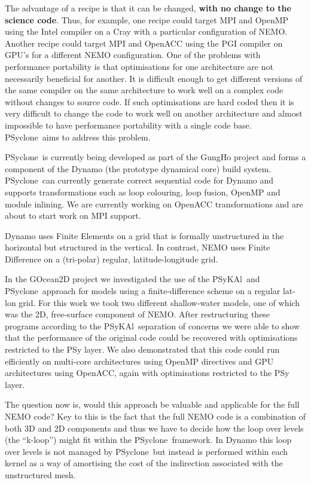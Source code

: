 \documentclass{article}
\newcommand{\psykal}{{PS}y{KA}l}
\newcommand{\psyclone}{{PS}yclone}
\begin{document}
The advantage of a recipe is that it can be changed, {\bf with no
  change to the science code}. Thus, for example, one recipe could
target MPI and OpenMP using the Intel compiler on a Cray with a
particular configuration of NEMO. Another recipe could target MPI and
OpenACC using the PGI compiler on GPU's for a different NEMO
configuration. One of the problems with performance portability is
that optimisations for one architecture are not necessarily beneficial
for another. It is difficult enough to get different versions of the
same compiler on the same architecture to work well on a complex code
without changes to source code. If such optimisations are hard coded
then it is very difficult to change the code to work well on another
architecture and almost impossible to have performance portability
with a single code base. \psyclone\ aims to address this problem.

\psyclone\ is currently being developed as part of the GungHo project
and forms a component of the Dynamo (the prototype dynamical core)
build system. \psyclone\ can currently generate correct sequential code
for Dynamo and supports transformations such as loop colouring, loop
fusion, OpenMP and module inlining. We are currently working
on OpenACC transformations and are about to start work on MPI support.

Dynamo uses Finite Elements on a grid that is formally
unstructured in the horizontal but structured in the vertical.  In
contrast, NEMO uses Finite Difference on a (tri-polar) regular,
latitude-longitude grid.

In the GOcean2D project we investigated the use of the \psykal\ and
\psyclone\ approach for models using a finite-difference scheme on a
regular lat-lon grid. For this work we took two different
shallow-water models, one of which was the 2D, free-surface component
of NEMO. After restructuring these programs according to the
\psykal\ separation of concerns we were able to show that the
performance of the original code could be recovered with optimisations
restricted to the PSy layer. We also demonstrated that this code could
run efficiently on multi-core architectures using OpenMP directives
and GPU architectures using OpenACC, again with optimisations
restricted to the PSy layer.

The question now is, would this approach be valuable and applicable
for the full NEMO code?  Key to this is the fact that the full NEMO
code is a combination of both 3D and 2D components and thus we have to
decide how the loop over levels (the ``k-loop'') might fit within the
\psyclone\ framework. In Dynamo this loop over levels is not managed by
\psyclone\ but instead is performed within each kernel as a way of
amortising the cost of the indirection associated with the
unstructured mesh.
\end{document}

